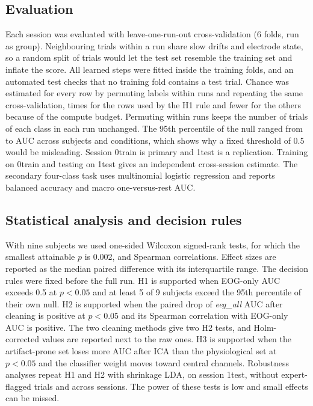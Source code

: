 \documentclass[conference]{IEEEtran}
\begin{document}
\subsection{Evaluation}
Each session was evaluated with leave-one-run-out cross-validation (6 folds, run as group). Neighbouring trials within a run share slow drifts and electrode state, so a random split of trials would let the test set resemble the training set and inflate the score. All learned steps were fitted inside the training folds, and an automated test checks that no training fold contains a test trial. Chance was estimated for every row by permuting labels within runs and repeating the same cross-validation, \NPermH{} times for the rows used by the H1 rule and fewer for the others because of the compute budget. Permuting within runs keeps the number of trials of each class in each run unchanged. The 95th percentile of the null ranged from \ChanceMin{} to \ChanceMax{} AUC across subjects and conditions, which shows why a fixed threshold of 0.5 would be misleading. Session 0train is primary and 1test is a replication. Training on 0train and testing on 1test gives an independent cross-session estimate. The secondary four-class task uses multinomial logistic regression and reports balanced accuracy and macro one-versus-rest AUC.

\subsection{Statistical analysis and decision rules}
With nine subjects we used one-sided Wilcoxon signed-rank tests, for which the smallest attainable $p$ is 0.002, and Spearman correlations. Effect sizes are reported as the median paired difference with its interquartile range. The decision rules were fixed before the full run. H1 is supported when EOG-only AUC exceeds 0.5 at $p<0.05$ and at least 5 of 9 subjects exceed the 95th percentile of their own null. H2 is supported when the paired drop of \emph{eeg\_all} AUC after cleaning is positive at $p<0.05$ and its Spearman correlation with EOG-only AUC is positive. The two cleaning methods give two H2 tests, and Holm-corrected values are reported next to the raw ones. H3 is supported when the artifact-prone set loses more AUC after ICA than the physiological set at $p<0.05$ and the classifier weight moves toward central channels. Robustness analyses repeat H1 and H2 with shrinkage LDA, on session 1test, without expert-flagged trials and across sessions. The power of these tests is low and small effects can be missed.
\end{document}
